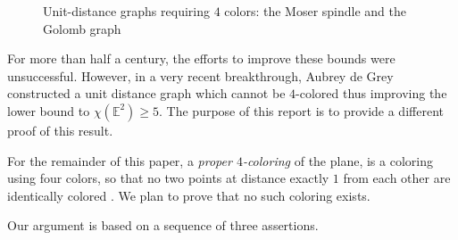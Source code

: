 \documentclass [11pt,oneside]{amsart}
\theoremstyle{definition}
\theoremstyle{plain}
\begin{document}
\begin{figure}[ht]
\caption{Unit-distance graphs requiring $4$ colors: the Moser spindle and the Golomb graph}
\label{mosergolomb}
\end{figure}

For more than half a century, the efforts to improve these bounds were unsuccessful. However, in a very recent breakthrough, Aubrey de Grey \cite{degrey} constructed a unit distance graph which cannot be $4$-colored thus improving the lower bound to $\chi(\mathbb{E}^2)\ge 5$. The purpose of this report is to provide a different proof of this result.

For the remainder of this paper, a \emph{proper $4$-coloring} of the plane, is a coloring using four colors, so that no two points at distance exactly $1$ from each other are identically colored . We plan to prove that no such coloring exists.

Our argument is based on a sequence of three assertions.
\end{document}
